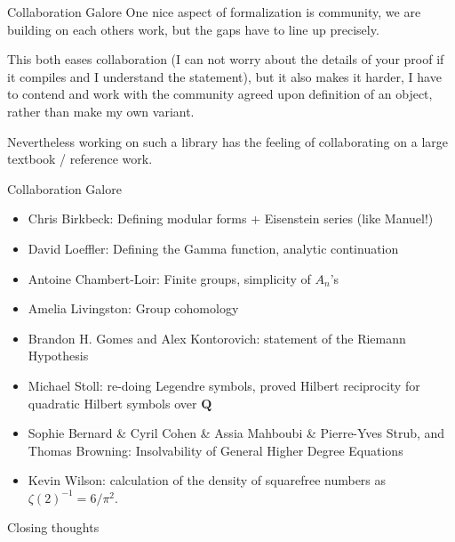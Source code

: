 \documentclass{beamer}
\theoremstyle{plain}
\newcommand{\QQ}{\mathbf Q}
\newcommand{\inv}{^{-1}}
\begin{document}
\begin{frame}{Collaboration Galore}
    One nice aspect of formalization is community, we are building on each others work, but the gaps have to line up precisely.

    This both eases collaboration (I can not worry about the details of your proof if it compiles and I understand the statement), but it also makes it harder, I have to contend and work with the community agreed upon definition of an object, rather than make my own variant.

    Nevertheless working on such a library has the feeling of collaborating on a large textbook / reference work.
\end{frame}

\begin{frame}{Collaboration Galore}
    \begin{itemize}
        \item Chris Birkbeck: Defining modular forms + Eisenstein series (like Manuel!)
        \item David Loeffler: Defining the Gamma function, analytic continuation
        \item Antoine Chambert-Loir: Finite groups, simplicity of $A_n$'s
        \item Amelia Livingston: Group cohomology
        \item Brandon H. Gomes and Alex Kontorovich: statement of the Riemann Hypothesis
        \item Michael Stoll: re-doing Legendre symbols, proved Hilbert reciprocity for quadratic Hilbert symbols over $\QQ$
        \item Sophie Bernard \& Cyril Cohen \& Assia Mahboubi \& Pierre-Yves Strub, and Thomas Browning: Insolvability of General Higher Degree Equations
        \item Kevin Wilson: calculation of the density of squarefree numbers as $\zeta (2)\inv = 6 / \pi ^2 $.
    \end{itemize}
\end{frame}

\begin{frame}{Closing thoughts}
\end{frame}
\end{document}
